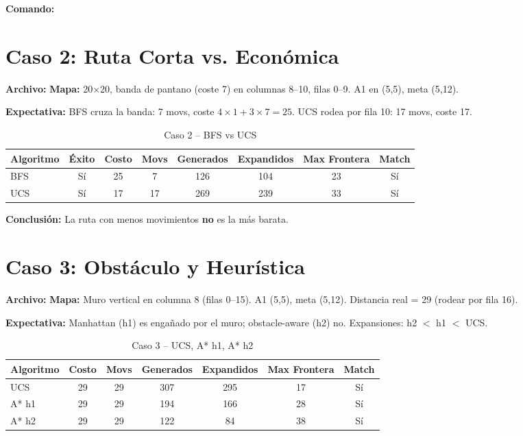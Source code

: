 \textbf{Comando:} 

\section{Caso 2: Ruta Corta vs. Económica}
\label{sec:caso2-detalle}

\textbf{Archivo:} 
\textbf{Mapa:} 20$\times$20, banda de pantano (coste 7) en columnas 8--10, filas 0--9.
A1 en (5,5), meta (5,12).

\textbf{Expectativa:} BFS cruza la banda: 7 movs, coste $4\times1 + 3\times7 = 25$.
UCS rodea por fila 10: 17 movs, coste 17.

\begin{table}[H]
\centering
\caption{Caso 2 -- BFS vs UCS}
\begin{tabular}{lccccccc}
\toprule
Algoritmo & Éxito & Costo & Movs & Generados & Expandidos & Max Frontera & Match \\
\midrule
BFS & Sí & 25 & 7 & 126 & 104 & 23 & Sí \\
UCS & Sí & 17 & 17 & 269 & 239 & 33 & Sí \\
\bottomrule
\end{tabular}
\end{table}

\textbf{Conclusión:} La ruta con menos movimientos \textbf{no} es la más barata.

\section{Caso 3: Obstáculo y Heurística}
\label{sec:caso3-detalle}

\textbf{Archivo:} 
\textbf{Mapa:} Muro vertical en columna 8 (filas 0--15). A1 (5,5), meta (5,12).
Distancia real = 29 (rodear por fila 16).

\textbf{Expectativa:} Manhattan (h1) es engañado por el muro; obstacle-aware (h2) no.
Expansiones: h2 $<$ h1 $<$ UCS.

\begin{table}[H]
\centering
\caption{Caso 3 -- UCS, A* h1, A* h2}
\begin{tabular}{lcccccc}
\toprule
Algoritmo & Costo & Movs & Generados & Expandidos & Max Frontera & Match \\
\midrule
UCS & 29 & 29 & 307 & 295 & 17 & Sí \\
A* h1 & 29 & 29 & 194 & 166 & 28 & Sí \\
A* h2 & 29 & 29 & 122 & 84 & 38 & Sí \\
\bottomrule
\end{tabular}
\end{table}

